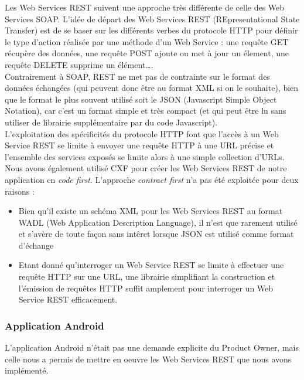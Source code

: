 Les Web Services REST suivent une approche très différente de celle des Web Services SOAP. L'idée de départ des Web Services REST (REpresentational State Transfer) est de se baser sur les différents \og verbes \fg{} du protocole HTTP pour définir le type d'action réalisée par une méthode d'un Web Service : une requête GET récupère des données, une requête POST ajoute ou met à jour un élement, une requête DELETE supprime un élément\ldots.\\
Contrairement à SOAP, REST ne met pas de contrainte sur le format des données échangées (qui peuvent donc être au format XML si on le souhaite), bien que le format le plus souvent utilisé soit le JSON (Javascript Simple Object Notation), car c'est un format simple et très compact (et qui peut être lu sans utiliser de librairie supplémentaire par du code Javascript).\\
L'exploitation des spécificités du protocole HTTP font que l'accès à un Web Service REST se limite à envoyer une requête HTTP à une URL précise et l'ensemble des services exposés se limite alors à une simple collection d'URLs.\\

Nous avons également utilisé CXF pour créer les Web Services REST de notre application en \textit{code first}. L'approche \textit{contract first} n'a pas été exploitée pour deux raisons :
\begin{itemize}
	\item Bien qu'il existe un schéma XML pour les Web Services REST au format  WADL (Web Application Description Language), il n'est que rarement utilisé et s'avère de toute façon sans intêret lorsque JSON est utilisé comme format d'échange
	\item Etant donné qu'interroger un Web Service REST se limite à effectuer une requête HTTP sur une URL, une librairie simplifiant la construction et l'émission de requêtes HTTP suffit amplement pour interroger un Web Service REST efficacement.
\end{itemize} 

\subsubsection*{Application Android}

L'application Android n'était pas une demande explicite du Product Owner, mais celle nous a permis de mettre en oeuvre les Web Services REST que nous avons implémenté.

